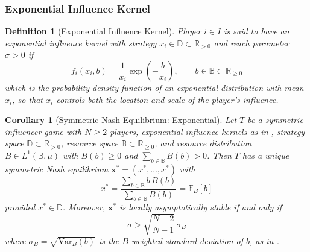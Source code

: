 \documentclass{article}
\newtheorem{corollary}{Corollary}[theorem]
\newtheorem{definition}{Definition}
\begin{document}
        \subsubsection{Exponential Influence Kernel}\label{subsubsec:SI_exponential_influence}
            \begin{definition}[Exponential Influence Kernel]\label{def:SI_exponential_kernel}
                Player $i \in I$ is said to have an exponential influence kernel with strategy $x_i \in \mathbb{D} \subset \mathbb{R}_{>0}$ and reach parameter $\sigma > 0$ if
                \begin{equation}\label{eq:SI_exponential_kernel}
                    f_i(x_i, b) = \frac{1}{x_i}\exp\!\left(-\frac{b}{x_i}\right), \qquad b \in \mathbb{B} \subset \mathbb{R}_{\geq 0}
                \end{equation}
                which is the probability density function of an exponential distribution with mean $x_i$, so that $x_i$ controls both the location and scale of the player's influence.
            \end{definition}

            \begin{corollary}[Symmetric Nash Equilibrium: Exponential]\label{cor:SI_exp_nash}
                Let $T$ be a symmetric influencer game with $N \geq 2$ players, exponential influence kernels as in , strategy space $\mathbb{D} \subset \mathbb{R}_{>0}$, resource space $\mathbb{B} \subset \mathbb{R}_{\geq 0}$, and resource distribution $B \in L^1(\mathbb{B},\mu)$ with $B(b) \geq 0$ and $\sum_{b\in\mathbb{B}} B(b) > 0$. Then $T$ has a unique symmetric Nash equilibrium $\mathbf{x}^* = (x^*,\ldots,x^*)$ with
                \begin{equation}\label{eq:SI_exp_nash}
                    x^* = \frac{\sum_{b\in\mathbb{B}} b\,B(b)}{\sum_{b\in\mathbb{B}} B(b)} = \mathbb{E}_B[b]
                \end{equation}
                provided $x^* \in \mathbb{D}$. Moreover, $\mathbf{x}^*$ is locally asymptotically stable if and only if
                \begin{equation}\label{eq:SI_exp_stability}
                    \sigma > \sqrt{\frac{N-2}{N-1}}\,\sigma_B
                \end{equation}
                where $\sigma_B = \sqrt{\mathrm{Var}_B(b)}$ is the $B$-weighted standard deviation of $b$, as in .
            \end{corollary}
\end{document}
